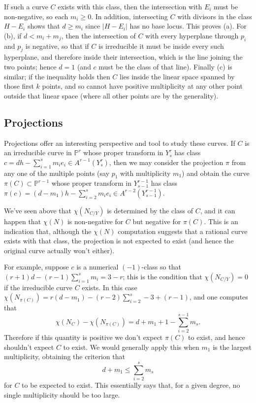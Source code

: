 \documentclass[12pt]{article}
\numberwithin{equation}{section}
\numberwithin{subeq}{equation}
\def\bbP{\mathbb{P}}
\begin{document}
\medskip{}
If such a curve $C$ exists with this class, then the intersection with $E_i$ must be non-negative, so each $m_i \geq 0$.
In addition, intersecting $C$ with divisors in the class $H-E_i$
shows that $d \geq m_i$ since $|H-E_i|$ has no base locus.
This proves (a).
For (b), if $d < m_i+m_j$,
then the intersection of $C$ with every hyperplane through $p_i$ and $p_j$ is negative,
so that if $C$ is irreducible it must be inside every such hyperplane,
and therefore inside their intersection, which is the line joining the two points;
hence $d=1$ (and $c$ must be the class of that line).
Finally (c) is similar; if the inequality holds then $C$ lies inside the linear space
spanned by those first $k$ points, and so cannot have positive multiplicity at
any other point outside that linear space (where all other points are by the generality).





\subsection{Projections}\label{projections}
Projections offer an interesting perspective and tool to study these curves.
If $C$ is an irreducible curve in $\bbP^r$ 
whose proper transform in $Y^r_s$ has class 
$c = dh-\sum_{i=1}^s m_ie_i \in A^{r-1}(Y^r_s)$, 
then we may consider the projection $\pi$ from any one of the multiple points
(say $p_1$ with multiplicity $m_1$)
and obtain the curve $\pi(C) \subset \bbP^{r-1}$
whose proper transform in $Y^{r-1}_{s-1}$ has class 
$\pi(c) = (d-m_1)h-\sum_{i=2}^s m_i e_i \in A^{r-2}(Y^{r-1}_{s-1})$.

We've seen above that $\chi(N_{C/Y})$ is determined by the class of $C$,
and it can happen that $\chi(N)$ is non-negative for $C$ but negative for $\pi(C)$.
This is an indication that,
although the $\chi(N)$ computation suggests that a rational curve exists with that class,
the projection is not expected to exist
(and hence the original curve actually won't either).

For example, suppose $c$ is a numerical $(-1)$-class
so that $(r+1)d-(r-1)\sum_{i=1}^s m_i =3-r$;
this is the condition that $\chi(N_{C/Y}) = 0$ if the irreducible curve $C$ exists.
In this case $\chi(N_{\pi(C)}) = r(d-m_1)-(r-2)\sum_{i=2}^{s} - 3 + (r-1)$,
and one computes that
\[
\chi(N_C) - \chi(N_{\pi(C)}) = d +m_1+1 - \sum_{i=2}^{s-1} m_s.
\]
Therefore if this quantity is positive we don't expect $\pi(C)$ to exist,
and hence shouldn't expect $C$ to exist.
We would generally apply this when $m_1$ is the largest multiplicity,
obtaining the criterion that
\begin{equation}\label{projectioninequality}
d+m_1 \leq \sum_{i=2}^{s} m_s
\end{equation}
for $C$ to be expected to exist.
This essentially says that, for a given degree, no single multiplicity should be too large.
\end{document}
